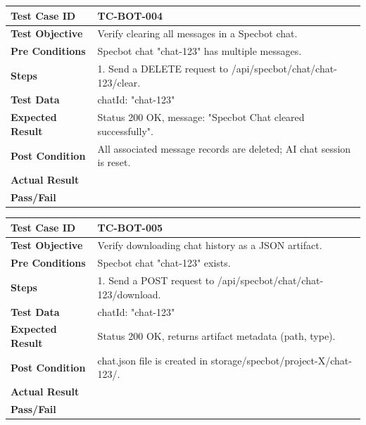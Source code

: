 \begin{longtable}{|p{}|p{}|}
\hline
\textbf{Test Case ID} & TC-BOT-004 \\ \hline
\textbf{Test Objective} & Verify clearing all messages in a Specbot chat. \\ \hline
\textbf{Pre Conditions} & Specbot chat "chat-123" has multiple messages. \\ \hline
\textbf{Steps} & 
1. Send a DELETE request to /api/specbot/chat/chat-123/clear. \\ \hline
\textbf{Test Data} & chatId: "chat-123" \\ \hline
\textbf{Expected Result} & Status 200 OK, message: "Specbot Chat cleared successfully". \\ \hline
\textbf{Post Condition} & All associated message records are deleted; AI chat session is reset. \\ \hline
\textbf{Actual Result} &  \\ \hline
\textbf{Pass/Fail} &  \\ \hline
\end{longtable}

\begin{longtable}{|p{}|p{}|}
\hline
\textbf{Test Case ID} & TC-BOT-005 \\ \hline
\textbf{Test Objective} & Verify downloading chat history as a JSON artifact. \\ \hline
\textbf{Pre Conditions} & Specbot chat "chat-123" exists. \\ \hline
\textbf{Steps} & 
1. Send a POST request to /api/specbot/chat/chat-123/download. \\ \hline
\textbf{Test Data} & chatId: "chat-123" \\ \hline
\textbf{Expected Result} & Status 200 OK, returns artifact metadata (path, type). \\ \hline
\textbf{Post Condition} & chat.json file is created in storage/specbot/project-X/chat-123/. \\ \hline
\textbf{Actual Result} &  \\ \hline
\textbf{Pass/Fail} &  \\ \hline
\end{longtable}

